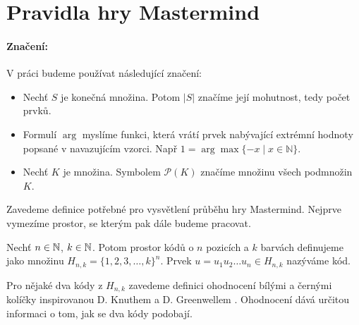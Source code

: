 \chapter{Pravidla hry Mastermind}

\subsubsection{Značení:}
V práci budeme používat následující značení:
\begin{itemize}
    \item Nechť $S$ je konečná množina. Potom $|S|$ značíme její mohutnost, tedy počet prvků.
    \item Formulí $\arg$ myslíme funkci, která vrátí prvek nabývající extrémní hodnoty popsané v navazujícím vzorci. Např $1 = \arg\max \{-x \mid x \in \mathbb{N}\}$.
    \item Nechť $K$ je množina. Symbolem $\mathcal{P}(K)$ značíme množinu všech podmnožin $K$.
\end{itemize}

Zavedeme definice potřebné pro vysvětlení průběhu hry Mastermind. Nejprve vymezíme prostor, se kterým pak dále budeme pracovat. 

\begin{definice}\label{def01:1}
  Nechť $n \in \mathbb{N} $, $k \in \mathbb{N} $. Potom prostor kódů o $n$ pozicích a $k$ barvách definujeme jako množinu $H_{n,k} = \{1, 2, 3, \dots, k\}^n$. Prvek $u = u_1u_2\dots u_n \in H_{n,k}$ nazýváme kód.
\end{definice}


Pro nějaké dva kódy z $H_{n,k}$ zavedeme definici ohodnocení bílými a černými kolíčky inspirovanou D. Knuthem \cite{donald_e__knuth_1977} a D. Greenwellem \cite{greenwell}. Ohodnocení dává určitou informaci o tom, jak se dva kódy podobají.


